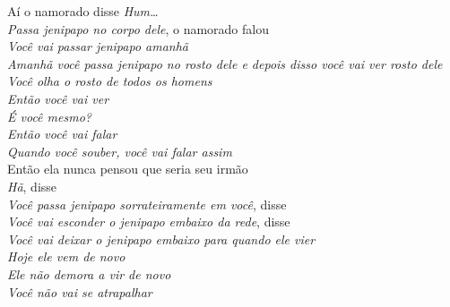 \begin{linenumbers}\begingroup\raggedright
\noindent Aí o namorado disse \textit{Hum\ldots{}}\\
\textit{Passa jenipapo no corpo dele}, o namorado falou\\
\textit{Você vai passar jenipapo amanhã}\\
\textit{Amanhã você passa jenipapo no rosto dele e depois disso você vai
ver rosto dele}\\
\textit{Você olha o rosto de todos os homens}\\
\textit{Então você vai ver}\\
\textit{É você mesmo?}\\
\textit{Então você vai falar}\\
\textit{Quando você souber, você vai falar assim}\\
Então ela nunca pensou que seria seu irmão\\
\textit{Hã}, disse\\
\textit{Você passa jenipapo sorrateiramente em você}, disse\\
\textit{Você vai esconder o jenipapo embaixo da rede}, disse\\
\textit{Você vai deixar o jenipapo embaixo para quando ele vier}\\
\textit{Hoje ele vem de novo}\\
\textit{Ele não demora a vir de novo}\\
\textit{Você não vai se atrapalhar}
\end{linenumbers}\endgroup

